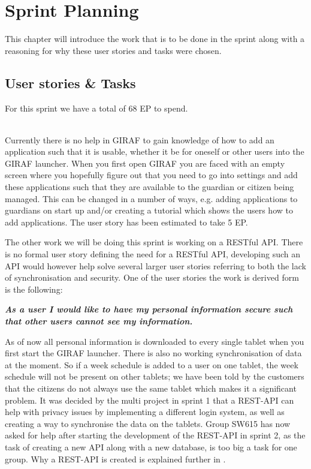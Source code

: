 \chapter{Sprint Planning}
This chapter will introduce the work that is to be done in the sprint along with a reasoning for why these user stories and tasks were chosen.

\section{User stories \& Tasks}
For this sprint we have a total of 68 EP to spend.

\begin{description}[style=unboxed]
    \item[{[}\phigh{]} As a guardian I would like the launcher to tell me how to add applications if none are active, such that it is easier to add applications for beginners.] \hfill \\ 
    Currently there is no help in GIRAF to gain knowledge of how to add an application such that it is usable, whether it be for oneself or other users into the GIRAF launcher.
    When you first open GIRAF you are faced with an empty screen where you hopefully figure out that you need to go into settings and add these applications such that they are available to the guardian or citizen being managed.
    This can be changed in a number of ways, e.g. adding applications to guardians on start up and/or creating a tutorial which shows the users how to add applications.
    The user story has been estimated to take 5 EP.
\end{description}
The other work we will be doing this sprint is working on a RESTful API.
There is no formal user story defining the need for a RESTful API, developing such an API would however help solve several larger user stories referring to both the lack of synchronisation and security.
One of the user stories the work is derived form is the following:

\textbf{\textit{As a user I would like to have my personal information secure such that other users cannot see my information.}}

As of now all personal information is downloaded to every single tablet when you first start the GIRAF launcher.
There is also no working synchronisation of data at the moment. 
So if a week schedule is added to a user on one tablet, the week schedule will not be present on other tablets; we have been told by the customers that the citizens do not always use the same tablet which makes it a significant problem.
It was decided by the multi project in sprint 1 that a REST-API can help with privacy issues by implementing a different login system, as well as creating a way to synchronise the data on the tablets.
Group SW615 has now asked for help after starting the development of the REST-API in sprint 2, as the task of creating a new API along with a new database, is too big a task for one group.
Why a REST-API is created is explained further in .

